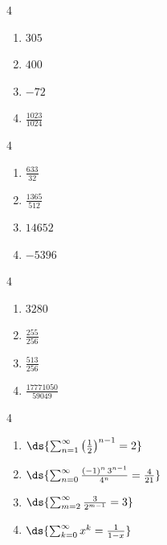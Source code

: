 \documentclass{ximera}
\begin{document}
\begin{multicols}{4} 
\begin{enumerate}
\setcounter{enumi}{\value{HW}}

\item $305$

\item  $400$

\item  $-72$

\item $\frac{1023}{1024}$

\setcounter{HW}{\value{enumi}}
\end{enumerate}
\end{multicols}

\begin{multicols}{4}
\begin{enumerate}
\setcounter{enumi}{\value{HW}}

\item $\frac{633}{32}$

\item $\frac{1365}{512}$

\item  $14652$

\item  $-5396$

\setcounter{HW}{\value{enumi}}
\end{enumerate}
\end{multicols}

\begin{multicols}{4}
\begin{enumerate}
\setcounter{enumi}{\value{HW}}

\item  $3280$

\item  $\frac{255}{256}$



\item $\frac{513}{256}$

\item $\frac{17771050}{59049}$

\setcounter{HW}{\value{enumi}}
\end{enumerate}
\end{multicols}

\begin{multicols}{4}
\begin{enumerate}
\setcounter{enumi}{\value{HW}}

\item $\ds{ \sum_{n = 1}^{\infty} \left( \frac{1}{2} \right)^{n-1} = 2}$  
\item $\ds{ \sum_{n = 0}^{\infty}  \frac{(-1)^n \, 3^{n-1}}{4^{n}} = \frac{4}{21}}$ 
\item $\ds{ \sum_{m = 2}^{\infty}   \frac{3}{2^{m-1}} = 3}$ 
\item $\ds{ \sum_{k =0}^{\infty}  x^{k} = \frac{1}{1-x}}$
\setcounter{HW}{\value{enumi}}
\end{enumerate}
\end{multicols}
\end{document}
